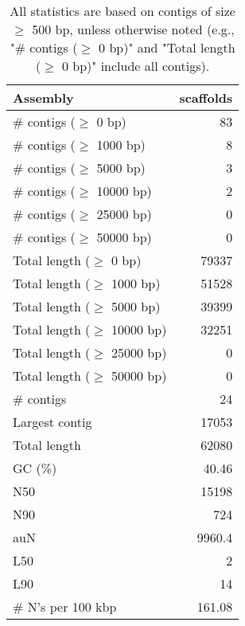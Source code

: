 \documentclass[12pt,a4paper]{article}
\begin{document}
\begin{table}[ht]
\begin{center}
\caption{All statistics are based on contigs of size $\geq$ 500 bp, unless otherwise noted (e.g., "\# contigs ($\geq$ 0 bp)" and "Total length ($\geq$ 0 bp)" include all contigs).}
\begin{tabular}{|l*{1}{|r}|}
\hline
Assembly & scaffolds \\ \hline
\# contigs ($\geq$ 0 bp) & 83 \\ \hline
\# contigs ($\geq$ 1000 bp) & 8 \\ \hline
\# contigs ($\geq$ 5000 bp) & 3 \\ \hline
\# contigs ($\geq$ 10000 bp) & 2 \\ \hline
\# contigs ($\geq$ 25000 bp) & 0 \\ \hline
\# contigs ($\geq$ 50000 bp) & 0 \\ \hline
Total length ($\geq$ 0 bp) & 79337 \\ \hline
Total length ($\geq$ 1000 bp) & 51528 \\ \hline
Total length ($\geq$ 5000 bp) & 39399 \\ \hline
Total length ($\geq$ 10000 bp) & 32251 \\ \hline
Total length ($\geq$ 25000 bp) & 0 \\ \hline
Total length ($\geq$ 50000 bp) & 0 \\ \hline
\# contigs & 24 \\ \hline
Largest contig & 17053 \\ \hline
Total length & 62080 \\ \hline
GC (\%) & 40.46 \\ \hline
N50 & 15198 \\ \hline
N90 & 724 \\ \hline
auN & 9960.4 \\ \hline
L50 & 2 \\ \hline
L90 & 14 \\ \hline
\# N's per 100 kbp & 161.08 \\ \hline
\end{tabular}
\end{center}
\end{table}
\end{document}
